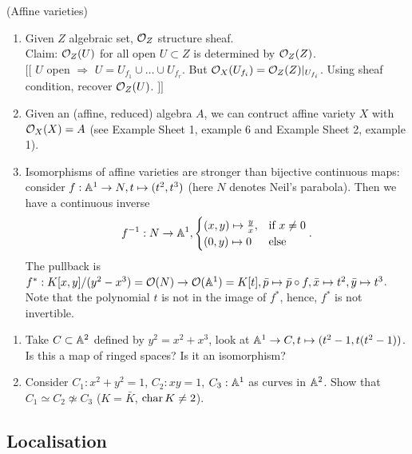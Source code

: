 \documentclass[a4paper,11pt]{article}
\begin{document}
{				\begin{remark}(Affine varieties)
					\begin{enumerate}
						\item Given $Z$ algebraic set, $\O_Z$ structure sheaf.\\
						Claim: $\O_Z(U)$ for all open $U\subset Z$ is determined by $\O_Z(Z)$.\\
						$[[$ $U$ open $\Longrightarrow$ $U=U_{f_1}\cup\dots\cup U_{f_r}$. But $\O_X(U_{f_i})=\O_Z(Z)|_{U_{f_i}}$. Using sheaf condition, recover $\O_Z(U)$. $]]$
						\item Given an (affine, reduced) algebra $A$, we can contruct affine variety $X$ with $\O_X(X)=A$ (see Example Sheet 1, example 6 and Example Sheet 2, example 1).
						\item Isomorphisms of affine varieties are stronger than bijective continuous maps: consider $f:\AA^1\rightarrow N, t\mapsto(t^2,t^3)$ (here $N$ denotes Neil's parabola). Then we have a continuous inverse
						\begin{equation*}
							f^{-1}:N\rightarrow\AA^1, \begin{cases}
								(x,y)\mapsto\frac{y}{x}, & \text{if }x\neq0\\
								(0,y)\mapsto0& \text{else}
							\end{cases}.
						\end{equation*}
						The pullback is $f^\ast:K[x,y]/(y^2-x^3)=\O(N)\rightarrow\O(\AA^1)=K[t],\bar{p}\mapsto\bar{p}\circ f,\bar{x}\mapsto t^2,\bar{y}\mapsto t^3$. Note that the polynomial $t$ is not in the image of $f^\ast$, hence, $f^\ast$ is not invertible.
					\end{enumerate}
				\end{remark}

				\begin{exc}
					\begin{enumerate}
						\item Take $C\subset\AA^2$ defined by $y^2=x^2+x^3$, look at $\AA^1\rightarrow C,t\mapsto(t^2-1,t(t^2-1))$. Is this a map of ringed spaces? Is it an isomorphism?
						\item Consider $C_1:x^2+y^2=1$, $C_2:xy=1$, $C_3:\AA^1$ as curves in $\AA^2$. Show that $C_1\simeq C_2\not\simeq C_3$ ($K=\bar{K}$, $\Char K\neq2$).
					\end{enumerate}
				\end{exc}
			}


		\subsection{Localisation}
\end{document}
